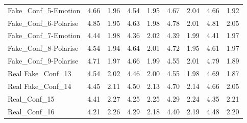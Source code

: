 \documentclass[empirical, authordate, issue]{jote-new-article}
\begin{document}
\begin{table}
\begin{tabularx}{\linewidth}{@{} X  S S S S | S S S S@{}}
    Fake\_Conf\_5-Emotion   & 4.66                                           & 1.96                                         & 4.54           & 1.95            & 4.67          & 2.04           & 4.66           & 1.92            \\
    Fake\_Conf\_6-Polarise  & 4.85                                           & 1.95                                         & 4.63           & 1.98            & 4.78          & 2.01           & 4.81           & 2.05            \\
    Fake\_Conf\_7-Emotion   & 4.44                                           & 1.98                                         & 4.36           & 2.02            & 4.39          & 1.99           & 4.41           & 1.97            \\
    Fake\_Conf\_8-Polarise  & 4.54                                           & 1.94                                         & 4.64           & 2.01            & 4.72          & 1.95           & 4.61           & 1.97            \\
    Fake\_Conf\_9-Polarise  & 4.71                                           & 1.97                                         & 4.66           & 1.99            & 4.55          & 2.01           & 4.79           & 1.89            \\
    Real Fake\_Conf\_13     & 4.54                                           & 2.02                                         & 4.46           & 2.00            & 4.55          & 1.98           & 4.69           & 1.87            \\
    Real Fake\_Conf\_14     & 4.45                                           & 2.11                                         & 4.50           & 2.13            & 4.70          & 2.14           & 4.66           & 2.05            \\
    Real\_Conf\_15          & 4.41                                           & 2.27                                         & 4.25           & 2.25            & 4.29          & 2.24           & 4.35           & 2.21            \\
    Real\_Conf\_16          & 4.21                                           & 2.26                                         & 4.29           & 2.18            & 4.40          & 2.19           & 4.48           & 2.20            \\
    \bottomrule
  \end{tabularx}



\end{table}
\end{document}
